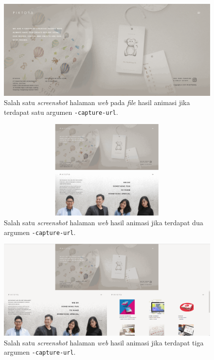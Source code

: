 \begin{figure}[H]
	\centering
		\includegraphics[scale=0.3]{Gambar/capture1.png}
	\caption{Salah satu \textit{screenshot} halaman \textit{web} pada \textit{file} hasil animasi jika terdapat satu argumen \texttt{-capture-url}.}
	\label{fig:capture1}
\end{figure}



\begin{figure}[H]
	\centering
		\includegraphics[scale=0.3]{Gambar/capture2.png}
	\caption{Salah satu \textit{screenshot} halaman \textit{web} hasil animasi jika terdapat dua argumen \texttt{-capture-url}.}
	\label{fig:capture2}
\end{figure}



\begin{figure}[H]
	\centering
		\includegraphics[scale=0.3]{Gambar/capture3.png}
	\caption{Salah satu \textit{screenshot} halaman \textit{web} hasil animasi jika terdapat tiga argumen \texttt{-capture-url}.}
	\label{fig:capture3}
\end{figure}


